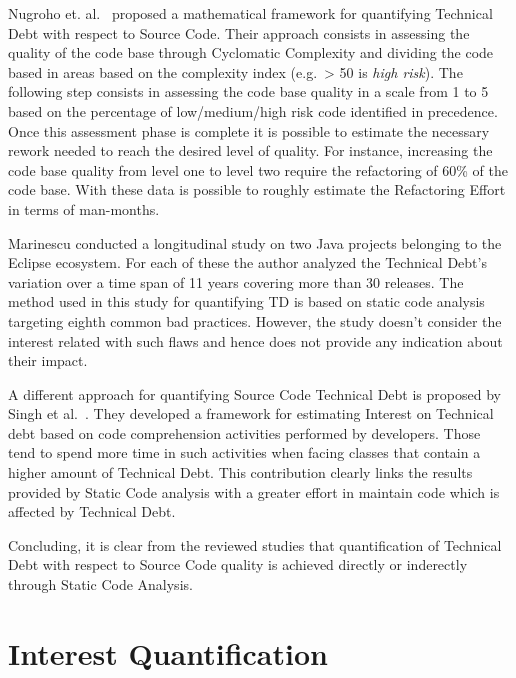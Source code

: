 Nugroho et. al.\ \cite{technicalDebtInterest} proposed a mathematical framework for quantifying Technical Debt with respect to Source Code. Their approach consists in assessing the quality of the code base through Cyclomatic Complexity \cite{cyclomatic_complexity} and dividing the code based in areas based on the complexity index (e.g.\ > 50 is \textit{high risk}). The following step consists in assessing the code base quality in a scale from 1 to 5 based on the percentage of low/medium/high risk code identified in precedence. Once this assessment phase is complete it is possible to estimate the necessary rework needed to reach the desired level of quality. For instance, increasing the code base quality from level one to level two require the refactoring of 60\% of the code base. With these data is possible to roughly estimate the Refactoring Effort in terms of man-months.

Marinescu \cite{assessing_technical_debt_eclipse} conducted a longitudinal study on two Java projects belonging to the Eclipse ecosystem. For each of these the author analyzed the Technical Debt's variation over a time span of 11 years covering more than 30 releases. The method used in this study for quantifying TD is based on static code analysis targeting eighth common bad practices. However, the study doesn't consider the interest related with such flaws and hence does not provide any indication about their impact.

A different approach for quantifying Source Code Technical Debt is proposed by Singh et al.\ \cite{code_td_comprehension_activities}. They developed a framework for estimating Interest on Technical debt based on code comprehension activities performed by developers. Those tend to spend more time in such activities when facing classes that contain a higher amount of Technical Debt. This contribution clearly links the results provided by Static Code analysis with a greater effort in maintain code which is affected by Technical Debt.

Concluding, it is clear from the reviewed studies that quantification of Technical Debt with respect to Source Code quality is achieved directly or inderectly through Static Code Analysis.


\section{Interest Quantification}

